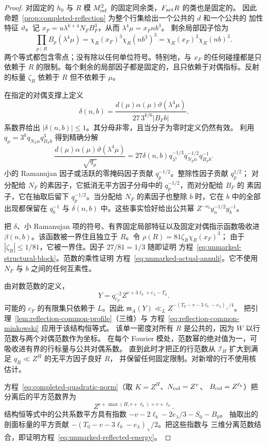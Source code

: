 \documentclass[11pt,a4paper]{article}
\numberwithin{equation}{section}
\numberwithin{figure}{section}
\theoremstyle{definition}
\theoremstyle{remark}
\begin{document}
\begin{proof}
对固定的 $h_0$ 与 $R$ 模 $M_{\rm ref}^2$ 的固定同余类，$F_{\rm act}R$ 的类也是固定的。
因此命题~\ref{prop:completed-reflection} 为整个行集给出一个公共的 $d$ 和一个公共的
加性特征 $\vartheta$。记 $x_F=u\lambda^{k+4}N_FB_F^3$，从而 $\lambda^4\mu=x_Fnb^3$。
剩余局部因子恰为
\[
 \prod_{p\mid R}B_p(\lambda^4\mu)
 =\chi_R(x_F)^3\chi_R(nb^3)^3
 =\chi_R(x_F)^3\chi_R(nb)^3.
\]
两个等式都包含零点；没有除以任何单位符号。特别地，与 $x_F$ 的任何碰撞都是只依赖于
$R$ 的限制。每个剩余的局部因子都是固定的，且只依赖于对偶指标。反射的标量
$\zeta_R$ 依赖于 $R$ 但不依赖于 $\mu$。

在指定的对偶支撑上定义
\[
 \delta(n,b)=
 \frac{d(\mu)\alpha(\mu)\vartheta(\lambda^4\mu)}
      {27\,3^{k/6}|B_Fb|}.
\]
系数界给出 $|\delta(n,b)|\le1$。其分母非零，且当分子为零时定义仍然有效。
利用 $q_\mu=3^kq_{N_Fn}q_{B_Fb}^3$ 得到精确分解
\[
 \frac{d(\mu)\alpha(\mu)\vartheta(\lambda^4\mu)}{\sqrt{q_\mu}}
 =27\delta(n,b)q_{\lambda^k}^{-1/3}
                  q_{N_Fn}^{-1/2}q_{B_Fb}^{-1}.
\]
小的 Ramanujan 因子或活跃的零掩码因子贡献 $q_p^{-1/2}$。整除性因子贡献 $q_p^{1/2}$；
对分配给 $N_F$ 的素因子，它抵消无平方因子分母中的 $q_p^{-1/2}$，而对分配给 $B_F$ 的
素因子，它在抽取后留下 $q_p^{-1/2}$。当分配给 $N_F$ 的素因子也整除 $b$ 时，它在 $b$
中的全部出现都保留在 $q_b^{-1}$ 与 $\delta(n,b)$ 中。这些事实恰好给出公共幂
$Z^{-\nu_0}y_n^{-1/2}y_b^{-1}$。

把 $\delta$、小 Ramanujan 项的符号、有界固定局部特征以及固定对偶指示函数吸收进
$\beta(n,b)$。该函数被一界住且独立于 $R$。令 $\rho(R)=81\zeta_R\chi_R(x_F)^3$；
由于 $|\zeta_R|\le1/81$，它被一界住。因子 $27/81=1/3$ 随即证明
方程~\eqref{eq:unmarked-structural-block}。范数的乘性证明
方程~\eqref{eq:unmarked-actual-annuli}。它不使用 $N_F$ 与 $b$ 之间的任何互素性。

由对数范数的定义，
\[
 Y=q_{c_F}^{-2}Z^{v+3\ell_b+e_\lambda-T_0}.
\]
可能的 $c_F$ 的有限集只依赖于 $L$。因此
$\mathfrak m_A(Y)\ll_L Z^{-(T_0-v-3\ell_b-e_\lambda)_+/4}$。
把引理~\ref{lem:reflection-common-profile}（三维）与
方程~\eqref{eq:reflection-common-minkowski} 应用于该结构恒等式。
该单一密度对所有 $R$ 是公共的，因为 $W$ 以行范数与两个对偶范数作为坐标。
在每个 Fourier 模处，范数幂的绝对值为一，可吸收进有界的行标量与公共对偶系数。
直到此时才把正的行范数从 $\mathcal I_H$ 扩大到满足 $q_R\ll Z^H$ 的无平方因子良好 $R$，
并保留任何固定限制。对新增的行不使用核估计。

方程~\eqref{eq:completed-quadratic-norm}（取 $K=Z^H$、$N_{\rm col}=Z^v$、
$B_{\rm col}=Z^{\ell_b}$）把分离后的平方范数界为
\[
 Z^{\epsilon+\max(H,v+\ell_b)+v+\ell_b}.
\]
结构恒等式中的公共系数平方具有指数 $-v-2\ell_b-2e_\lambda/3-S_0-B_0$。
抽取出的剖面标量的平方贡献 $-(T_0-v-3\ell_b-e_\lambda)_+/2$。把这些指数与
三维分离范数结合，即证明方程~\eqref{eq:unmarked-reflected-energy}。
\end{proof}
\end{document}
